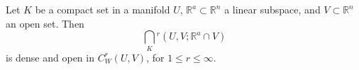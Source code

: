 Let $K$ be a compact set in a manifold $U$, $\mathbb{R}^a \subset \mathbb{R}^n$ a linear subspace, and $V \subset \mathbb{R}^n$ an open set. Then
$$\bigcap_K{}^r(U,V; \mathbb{R}^a \cap V)$$
is dense and open in $C^r_W(U,V)$, for $1 \leqslant r \leqslant \infty$.
